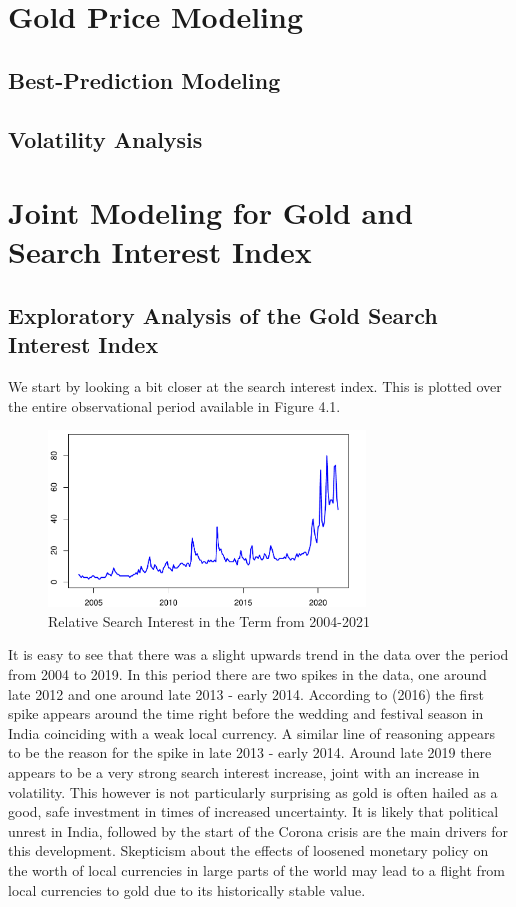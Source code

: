 \documentclass[a4paper]{article}
\theoremstyle{definition}
\begin{document}
\section{Gold Price Modeling}
\subsection{Best-Prediction Modeling}
\subsection{Volatility Analysis}
%
\newpage
\section{Joint Modeling for Gold and Search Interest Index}
\subsection{Exploratory Analysis of the Gold Search Interest Index}
We start by looking a bit closer at the search interest index. This is plotted over the entire observational period available in Figure 4.1.
	\begin{figure}[!t]
	\centering
	\caption{Relative Search Interest in the Term  from 2004-2021}
	\includegraphics[width=0.75\textwidth]{GoldSearchAlone}
	\end{figure}
It is easy to see that there was a slight upwards trend in the data over the period from 2004 to 2019. In this period there are two spikes in the data, one around late 2012 and one around late 2013 - early 2014. According to \citeauthor{Desk.24062016} (2016) the first spike appears around the time right before the wedding and festival season in India coinciding with a weak local currency. A similar line of reasoning appears to be the reason for the spike in late 2013 - early 2014. Around late 2019 there appears to be a very strong search interest increase, joint with an increase in volatility. This however is not particularly surprising as gold is often hailed as a good, safe investment in times of increased uncertainty. It is likely that political unrest in India, followed by the start of the Corona crisis are the main drivers for this development. Skepticism about the effects of loosened monetary policy on the worth of local currencies in large parts of the world may lead to a flight from local currencies to gold due to its historically stable value. 
%
\end{document}
